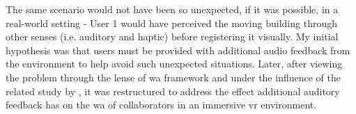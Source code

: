 The same scenario would not have been so unexpected, if it was possible, in a real-world setting - User 1 would have perceived the moving building through other senses (i.e. auditory and haptic) before registering it visually. 
My initial hypothesis was that users must be provided with additional audio feedback from the environment to help avoid such unexpected situations. Later, after viewing the problem through the lense of \gls{wa} framework and under the influence of the related study by \cite{gutwin_chalk_2011},  it was restructured to address the effect additional auditory feedback has on the \gls{wa} of collaborators in an immersive \gls{vr} environment.

 

